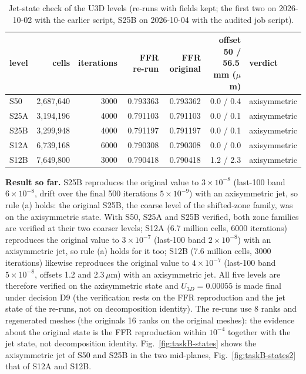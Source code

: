 \documentclass[11pt]{article}
\begin{document}
\begin{table}[H]
\centering
\caption{\label{tab:taskB}Jet-state check of the U3D levels (re-runs with fields kept; the first two on 2026-10-02 with the earlier script, S25B on 2026-10-04 with the audited job script).}
\small
\begin{tabular}{lrrrrrl}
\toprule
level & cells & iterations & FFR re-run & FFR original & offset 50 / 56.5\,mm ($\mu$m) & verdict \\
\midrule
S50 & 2{,}687{,}640 & 3000 & 0.793363 & 0.793362 & 0.0 / 0.4 & axisymmetric \\
S25A & 3{,}194{,}196 & 4000 & 0.791103 & 0.791103 & 0.0 / 0.1 & axisymmetric \\
S25B & 3{,}299{,}948 & 4000 & 0.791197 & 0.791197 & 0.0 / 0.1 & axisymmetric \\
S12A & 6{,}739{,}168 & 6000 & 0.790308 & 0.790308 & 0.0 / 0.0 & axisymmetric \\
S12B & 7{,}649{,}800 & 3000 & 0.790418 & 0.790418 & 1.2 / 2.3 & axisymmetric \\
\bottomrule
\end{tabular}
\end{table}

\textbf{Result so far.} S25B reproduces the original value to $3\times10^{-8}$ (last-100 band $6\times10^{-8}$, drift over the final 500 iterations $5\times10^{-9}$) with an axisymmetric jet, so rule (a) holds: the original S25B, the coarse level of the shifted-zone family, was on the axisymmetric state. With S50, S25A and S25B verified, both zone families are verified at their two coarser levels; S12A (6.7 million cells, 6000 iterations) reproduces the original value to $3\times10^{-7}$ (last-100 band $2\times10^{-8}$) with an axisymmetric jet, so rule (a) holds for it too; S12B (7.6 million cells, 3000 iterations) likewise reproduces the original value to $4\times10^{-7}$ (last-100 band $5\times10^{-8}$, offsets 1.2 and 2.3\,$\mu$m) with an axisymmetric jet. All five levels are therefore verified on the axisymmetric state and $U_{3D}=0.00055$ is made final under decision D9 (the verification rests on the FFR reproduction and the jet state of the re-runs, not on decomposition identity). The re-runs use 8 ranks and regenerated meshes (the originals 16 ranks on the original meshes): the evidence about the original state is the FFR reproduction within $10^{-4}$ together with the jet state, not decomposition identity. Fig.~\ref{fig:taskB-states} shows the axisymmetric jet of S50 and S25B in the two mid-planes, Fig.~\ref{fig:taskB-states2} that of S12A and S12B.
\end{document}
